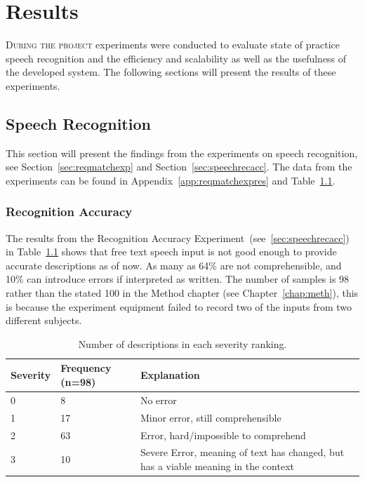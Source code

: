 \chapter{Results}
\label{cha:result}
\lettrine[lines=4, loversize=-0.1, lraise=0.1]{D}{uring the project} experiments were conducted to evaluate state of practice speech recognition and the efficiency and scalability as well as the usefulness of the developed system. The following sections will present the results of these experiments.

\section{Speech Recognition}
This section will present the findings from the experiments on speech recognition, see Section~\ref{sec:reqmatchexp} and Section~\ref{sec:speechrecacc}. The data from the experiments can be found in Appendix~\ref{app:reqmatchexpres} and Table~\ref{tab:recaccexp}.

\subsection{Recognition Accuracy}
\label{subsec:recaccresult}
The results from the Recognition Accuracy Experiment~(see~\ref{sec:speechrecacc}) in Table~\ref{tab:recaccexp} shows that free text speech input is not good enough to provide accurate descriptions as of now. As many as 64\% are not comprehensible, and 10\% can introduce errors if interpreted as written. The number of samples is 98 rather than the stated 100 in the Method chapter (see Chapter~\ref{chap:meth}), this is because the experiment equipment failed to record two of the inputs from two different subjects.
\begin{table}[h]
\centering
\caption{Number of descriptions in each severity ranking.}
    \begin{tabular}{ l  p{2cm}  p{7.5cm} }
        \hline
        Severity & Frequency (n=98) & Explanation \\
        \hline
        0 & 8 & No error\\
        1 & 17 &  Minor error, still comprehensible\\
        2 & 63 &  Error, hard/impossible to comprehend\\
        3 & 10 & Severe Error, meaning of text has changed, but has a viable meaning in the context\\
        \end{tabular}
\label{tab:recaccexp}
\end{table}

